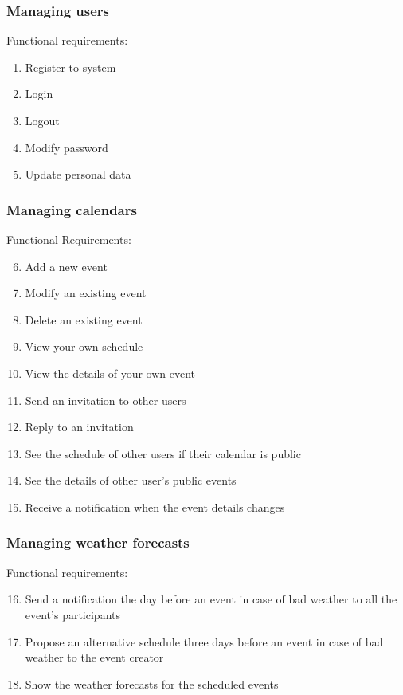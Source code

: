 \documentclass[10pt,a4paper,titlepage]{article}
\begin{document}
\subsubsection{Managing users}
Functional requirements:
\begin{enumerate}[label = FR \arabic*:]
\item Register to system
\item Login
\item Logout
\item Modify password
\item Update personal data
\end{enumerate}

\subsubsection{Managing calendars}
Functional Requirements:
\begin{enumerate}[label = FR \arabic*:]
\setcounter{enumi}{5}
\item Add a new event
\item Modify an existing event
\item Delete an existing event
\item View your own schedule 
\item View the details of your own event
\item Send an invitation to other users
\item Reply to an invitation
\item See the schedule of other users if their calendar is public
\item See the details of other user's public events
\item Receive a notification when the event details changes
\end{enumerate}

\subsubsection{Managing weather forecasts}
Functional requirements:
\begin{enumerate}[label = FR \arabic*:]
\setcounter{enumi}{15}
\item Send a notification the day before an event in case of bad weather to all the event's participants
\item Propose an alternative schedule three days before an event in case of bad weather to the event creator
\item Show the weather forecasts for the scheduled events 
\end{enumerate}
\end{document}
